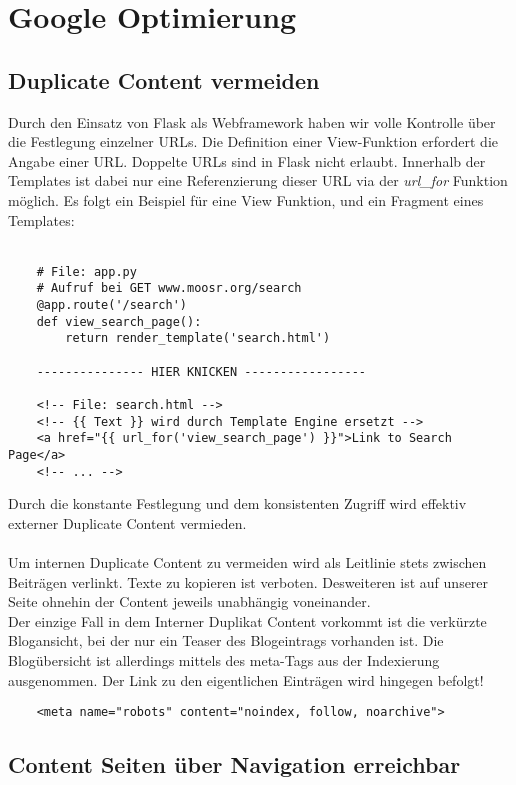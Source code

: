 \chapter{Google Optimierung}

\section{Duplicate Content vermeiden}
Durch den Einsatz von Flask als Webframework haben wir volle Kontrolle über
die Festlegung einzelner URLs. Die Definition einer View-Funktion erfordert die
Angabe einer URL. Doppelte URLs sind in Flask nicht erlaubt. Innerhalb der
Templates ist dabei nur eine Referenzierung dieser URL via der \emph{url\_for}
Funktion möglich. Es folgt ein Beispiel für eine View Funktion, und ein Fragment
eines Templates:
\\
\\
\begin{verbatim}
    # File: app.py
    # Aufruf bei GET www.moosr.org/search
    @app.route('/search')
    def view_search_page():
        return render_template('search.html')

    --------------- HIER KNICKEN -----------------

    <!-- File: search.html -->
    <!-- {{ Text }} wird durch Template Engine ersetzt -->
    <a href="{{ url_for('view_search_page') }}">Link to Search Page</a>
    <!-- ... -->
\end{verbatim}

Durch die konstante Festlegung und dem konsistenten Zugriff wird effektiv
externer Duplicate Content vermieden. 
\\
\\
Um internen Duplicate Content zu vermeiden wird als Leitlinie stets zwischen
Beiträgen verlinkt. Texte zu kopieren ist verboten. Desweiteren ist auf unserer 
Seite ohnehin der Content jeweils unabhängig voneinander.
\\
Der einzige Fall in dem Interner Duplikat Content vorkommt ist die verkürzte
Blogansicht, bei der nur ein Teaser des Blogeintrags vorhanden ist. Die
Blogübersicht ist allerdings mittels des meta-Tags aus der Indexierung
ausgenommen. Der Link zu den eigentlichen Einträgen wird hingegen befolgt!

\begin{verbatim}
    <meta name="robots" content="noindex, follow, noarchive">
\end{verbatim}

\section{Content Seiten über Navigation erreichbar}




